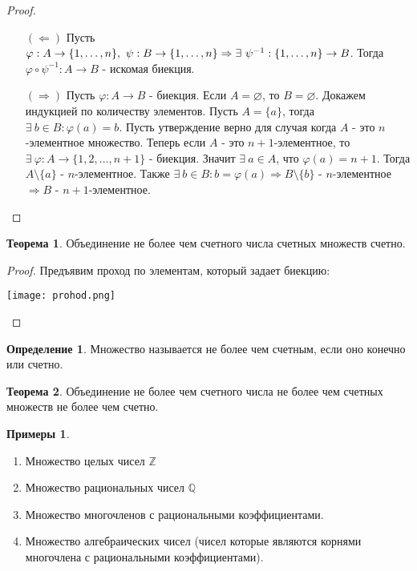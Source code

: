 \documentclass[a4paper, 12pt]{article}
\newcommand{\Z}{\mathbb{Z}}
\newcommand{\Q}{\mathbb{Q}}
\renewcommand{\phi}{\varphi}
\renewcommand{\emptyset}{\varnothing}
\newcommand\tab[1][.5cm]{\hspace*{#1}}
\theoremstyle{definition}
\newtheorem*{definition}{Определение}
\newtheorem*{theorem}{Теорема}
\newtheorem*{examples}{Примеры}
\begin{document}
        \begin{proof}\tab
            \begin{itemize}
                \item[$(\Leftarrow)$] Пусть $\phi:A\to \{1,\dots, n\}, \ \psi:B\to \{1,\dots, n\}\\
                \Rightarrow \exists \ \psi^{-1}:\{1,\dots, n\}\to B$. Тогда $\phi \circ \psi^{-1}:A\to B$ - искомая биекция.
                \item[$(\Rightarrow)$] Пусть $\phi:A\to B$ - биекция. Если $A=\emptyset$, то $B=\emptyset$. Докажем индукцией по количеству элементов. Пусть $A=\{a\}$, тогда $\exists \ b\in B: \phi(a)=b$. Пусть утверждение верно для случая когда $A$ - это $n$-элементное множество. Теперь если $A$ - это $n+1$-элементное, то $\exists \ \phi:A\to \{1,2,...,n+1\}$ - биекция. Значит $\exists \ a\in A$, что $\phi(a)=n+1$. Тогда $A\setminus\{a\}$ - $n$-элементное. Также $\exists \ b\in B: b=\phi(a) \Rightarrow B\setminus\{b\}$ - $n$-элементное $\Rightarrow  B$ - $n+1$-элементное.
            \end{itemize}
        \end{proof}
        \begin{theorem}
            Объединение не более чем счетного числа счетных множеств счетно.
        \end{theorem}
        \begin{proof}
            Предъявим проход по элементам, который задает биекцию:
            \begin{center}
                \texttt{[image: prohod.png]}
            \end{center}
        \end{proof}
        \begin{definition}
            Множество называется не более чем счетным, если оно конечно или счетно.
        \end{definition}
        \begin{theorem}
            Объединение не более чем счетного числа не более чем счетных множеств не более чем счетно.
        \end{theorem} 
        \begin{examples}
            \begin{enumerate}\tab
                \item Множество целых чисел $\Z$
                \item Множество рациональных чисел $\Q$
                \item Множество многочленов с рациональными коэффициентами.
                \item Множество алгебраических чисел (чисел которые являются корнями многочлена с рациональными коэффициентами).
            \end{enumerate}
        \end{examples}
\end{document}
